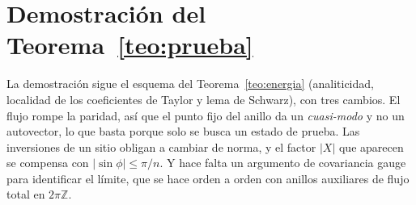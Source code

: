 \documentclass[11pt,a4paper]{article}
\theoremstyle{remark}
\begin{document}
\section{Demostración del Teorema~\ref{teo:prueba}}\label{sec:prueba}

La demostración sigue el esquema del Teorema~\ref{teo:energia} (analiticidad, localidad de los
coeficientes de Taylor y lema de Schwarz), con tres cambios. El flujo rompe la paridad, así que el
punto fijo del anillo da un \emph{cuasi-modo} y no un autovector, lo que basta porque solo se busca un
estado de prueba. Las inversiones de un sitio obligan a cambiar de norma, y el factor $|X|$ que
aparecen se compensa con $|\sin\phi|\le\pi/n$. Y hace falta un argumento de covariancia gauge para
identificar el límite, que se hace orden a orden con anillos auxiliares de flujo total en
$2\pi\mathbb Z$.
\end{document}
